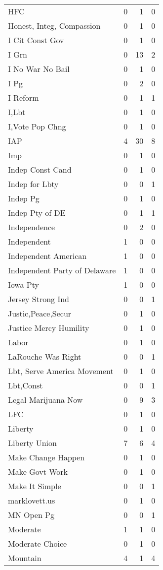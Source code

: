 \begin{supertabular}{lrrr}
HFC & 0 & 1 & 0\\
Honest, Integ, Compassion & 0 & 1 & 0\\
I Cit Const Gov & 0 & 1 & 0\\
I Grn & 0 & 13 & 2\\
I No War No Bail & 0 & 1 & 0\\
I Pg & 0 & 2 & 0\\
I Reform & 0 & 1 & 1\\
I,Lbt & 0 & 1 & 0\\
I,Vote Pop Chng & 0 & 1 & 0\\
IAP & 4 & 30 & 8\\
Imp & 0 & 1 & 0\\
Indep Const Cand & 0 & 1 & 0\\
Indep for Lbty & 0 & 0 & 1\\
Indep Pg & 0 & 1 & 0\\
Indep Pty of DE & 0 & 1 & 1\\
Independence & 0 & 2 & 0\\
Independent & 1 & 0 & 0\\
Independent American & 1 & 0 & 0\\
Independent Party of Delaware & 1 & 0 & 0\\
Iowa Pty & 1 & 0 & 0\\
Jersey Strong Ind & 0 & 0 & 1\\
Justic,Peace,Secur & 0 & 1 & 0\\
Justice Mercy Humility & 0 & 1 & 0\\
Labor & 0 & 1 & 0\\
LaRouche Was Right & 0 & 0 & 1\\
Lbt, Serve America Movement & 0 & 1 & 0\\
Lbt,Const & 0 & 0 & 1\\
Legal Marijuana Now & 0 & 9 & 3\\
LFC & 0 & 1 & 0\\
Liberty & 0 & 1 & 0\\
Liberty Union & 7 & 6 & 4\\
Make Change Happen & 0 & 1 & 0\\
Make Govt Work & 0 & 1 & 0\\
Make It Simple & 0 & 0 & 1\\
marklovett.us & 0 & 1 & 0\\
MN Open Pg & 0 & 0 & 1\\
Moderate & 1 & 1 & 0\\
Moderate Choice & 0 & 1 & 0\\
Mountain & 4 & 1 & 4\\

\end{supertabular}
